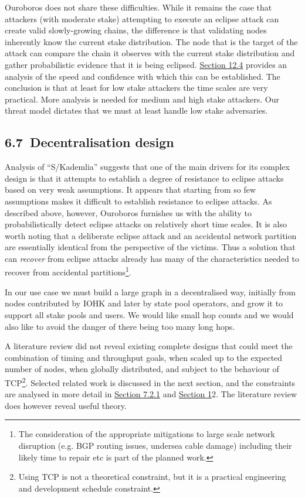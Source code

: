 \documentclass[11pt,a4paper]{article}
\begin{document}
Ouroboros does not share these difficulties. While it remains the case
that attackers (with moderate stake) attempting to execute an eclipse
attack can create valid slowly-growing chains, the difference is that
validating nodes inherently know the current stake distribution. The
node that is the target of the attack can compare the chain it observes
with the current stake distribution and gather probabilistic evidence
that it is being eclipsed.
\protect\hyperlink{performance-model-of-ouroboros-praos}{{Section 12.4}}
provides an analysis of the speed and confidence with which this can be
established. The conclusion is that at least for low stake attackers the
time scales are very practical. More analysis is needed for medium and
high stake attackers. Our threat model dictates that we must at least
handle low stake adversaries.

\hypertarget{decentralisation-design}{%
\subsection{​6.7​~Decentralisation
design}\label{decentralisation-design}}

Analysis of ``S/Kademlia'' suggests that one of the main drivers for its
complex design is that it attempts to establish a degree of resistance
to eclipse attacks based on very weak assumptions. It appears that
starting from so few assumptions makes it difficult to establish
resistance to eclipse attacks. As described above, however, Ouroboros
furnishes us with the ability to probabilistically detect eclipse
attacks on relatively short time scales. It is also worth noting that a
deliberate eclipse attack and an accidental network partition are
essentially identical from the perspective of the victims. Thus a
solution that can \emph{recover} from eclipse attacks already has many
of the characteristics needed to recover from accidental
partitions\footnote{The consideration of the appropriate mitigations to
  large scale network disruption (e.g. BGP routing issues, undersea
  cable damage) including their likely time to repair etc is part of the
  planned work.}.

In our use case we must build a large graph in a decentralised way,
initially from nodes contributed by IOHK and later by state pool
operators, and grow it to support all stake pools and users. We would
like small hop counts and we would also like to avoid the danger of
there being too many long hops.

A literature review did not reveal existing complete designs that could
meet the combination of timing and throughput goals, when scaled up to
the expected number of nodes, when globally distributed, and subject to
the behaviour of TCP\footnote{Using TCP is not a theoretical constraint,
  but it is a practical engineering and development schedule constraint.}.
Selected related work is discussed in the next section, and the
constraints are analysed in more detail in
\protect\hyperlink{timeliness-constraint}{{Section 7.2.1}} and
\protect\hyperlink{annexes}{{Section 1}}2. The literature review does
however reveal useful theory.
\end{document}
